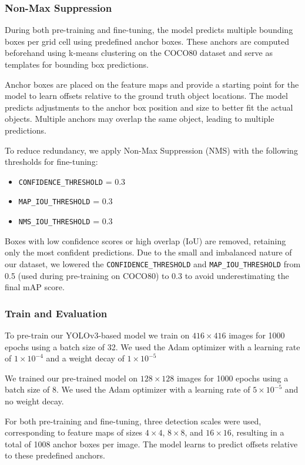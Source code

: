 \documentclass{article}
\begin{document}
\subsubsection{Non-Max Suppression}
During both pre-training and fine-tuning, the model predicts multiple bounding boxes per grid cell using predefined anchor boxes. These anchors are computed beforehand using k-means clustering on the COCO80 dataset and serve as templates for bounding box predictions.

Anchor boxes are placed on the feature maps and provide a starting point for the model to learn offsets relative to the ground truth object locations. The model predicts adjustments to the anchor box position and size to better fit the actual objects. Multiple anchors may overlap the same object, leading to multiple predictions.

To reduce redundancy, we apply Non-Max Suppression (NMS) with the following thresholds for fine-tuning:
\begin{itemize}
    \item \texttt{CONFIDENCE\_THRESHOLD} = 0.3
    \item \texttt{MAP\_IOU\_THRESHOLD} = 0.3
    \item \texttt{NMS\_IOU\_THRESHOLD} = 0.3
\end{itemize}

Boxes with low confidence scores or high overlap (IoU) are removed, retaining only the most confident predictions. Due to the small and imbalanced nature of our dataset, we lowered the \texttt{CONFIDENCE\_THRESHOLD} and \texttt{MAP\_IOU\_THRESHOLD} from 0.5 (used during pre-training on COCO80) to 0.3 to avoid underestimating the final mAP score.

\subsubsection{Train and Evaluation}
To pre-train our YOLOv3-based model we train on $416 \times 416$ images for 1000 epochs using a batch size of 32. We used the Adam optimizer with a learning rate of $1 \times 10^{-4}$ and a weight decay of $1 \times 10^{-5}$

We trained our pre-trained model on $128 \times 128$ images for 1000 epochs using a batch size of 8. We used the Adam optimizer with a learning rate of $5 \times 10^{-5}$ and no weight decay.

For both pre-training and fine-tuning, three detection scales were used, corresponding to feature maps of sizes $4 \times 4$, $8 \times 8$, and $16 \times 16$, resulting in a total of 1008 anchor boxes per image. The model learns to predict offsets relative to these predefined anchors.
\end{document}
